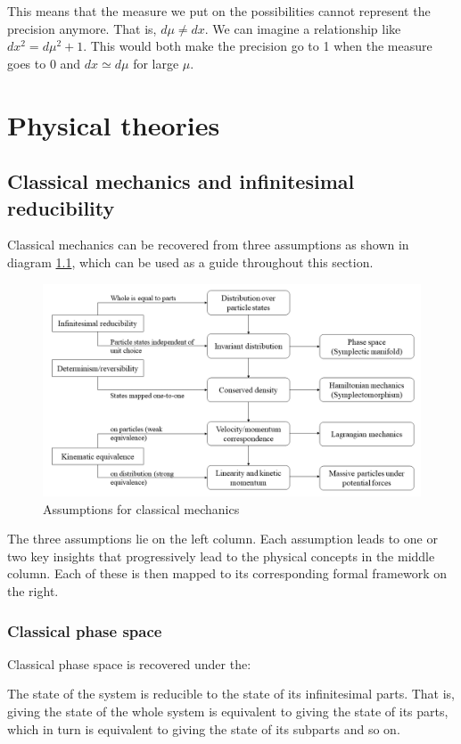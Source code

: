 \documentclass[11pt,letterpaper,fleqn]{memoir} %
\begin{document}
This means that the measure we put on the possibilities cannot represent the precision anymore. That is, $d\mu \neq dx$. We can imagine a relationship like $dx^2 = d\mu^2 + 1$. This would both make the precision go to 1 when the measure goes to 0 and $dx \simeq d\mu$ for large $\mu$.

\chapter{Physical theories}

\section{Classical mechanics and infinitesimal reducibility}

Classical mechanics can be recovered from three assumptions as shown in diagram \ref{fig_classical_diagram}, which can be used as a guide throughout this section.

\begin{figure}[h]
	\includegraphics[width=\columnwidth]{images/ClassicalDiagram.png}
	\caption{Assumptions for classical mechanics}\label{fig_classical_diagram}
\end{figure}

The three assumptions lie on the left column. Each assumption leads to one or two key insights that progressively lead to the physical concepts in the middle column. Each of these is then mapped to its corresponding formal framework on the right.

\subsection{Classical phase space}

Classical phase space is recovered under the:
\begin{assump}
	The state of the system is reducible to the state of its infinitesimal parts. That is, giving the state of the whole system is equivalent to giving the state of its parts, which in turn is equivalent to giving the state of its subparts and so on.
\end{assump}
\end{document}
